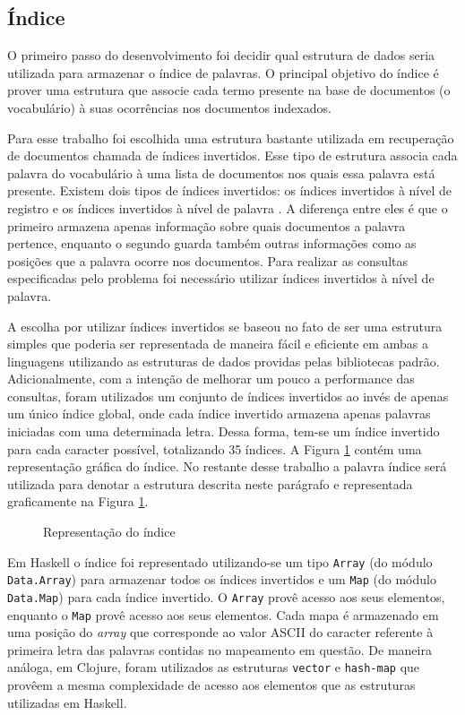 \subsection{Índice}

O primeiro passo do desenvolvimento foi decidir qual estrutura de dados seria utilizada para armazenar o índice de palavras. O principal objetivo do índice é prover uma estrutura que associe cada termo presente na base de documentos (o vocabulário) à suas ocorrências nos documentos indexados.

Para esse trabalho foi escolhida uma estrutura bastante utilizada em recuperação de documentos chamada de índices invertidos. Esse tipo de estrutura associa cada palavra  do vocabulário à uma lista de documentos nos quais essa palavra está presente. Existem dois tipos de índices invertidos: os índices invertidos à nível de registro e os índices invertidos à nível de palavra \cite{baeza1999modern}. A diferença entre eles é que o primeiro armazena apenas informação sobre quais documentos a palavra pertence, enquanto o segundo guarda também outras informações como as posições que a palavra ocorre nos documentos. Para realizar as consultas especificadas pelo problema foi necessário utilizar índices invertidos à nível de palavra.

A escolha por utilizar índices invertidos se baseou no fato de ser uma estrutura simples que poderia ser representada de maneira fácil e eficiente em ambas a linguagens utilizando as estruturas de dados providas pelas bibliotecas padrão. Adicionalmente, com a intenção de melhorar um pouco a performance das consultas, foram utilizados um conjunto de índices invertidos ao invés de apenas um único índice global, onde cada índice invertido armazena apenas palavras iniciadas com uma determinada letra. Dessa forma, tem-se um índice invertido para cada caracter possível, totalizando 35 índices. A Figura \ref{fig:indice} contém uma representação gráfica do índice. No restante desse trabalho a palavra índice será utilizada para denotar a estrutura descrita neste parágrafo e representada graficamente na Figura \ref{fig:indice}.

\begin{figure}[h]
 \centering
 \def\svgwidth{0.6\columnwidth}
 
 \caption{Representação do índice}
 \label{fig:indice}
\end{figure}


Em Haskell o índice foi representado utilizando-se um tipo \verb|Array| (do módulo \verb|Data.Array|) para armazenar todos os índices invertidos e um \verb|Map| (do módulo \verb|Data.Map|) para cada índice invertido. O \verb|Array| provê acesso  aos seus elementos, enquanto o \verb|Map| provê acesso  aos seus elementos. Cada mapa é armazenado em uma posição do \emph{array} que corresponde ao valor ASCII do caracter referente à primeira letra das palavras contidas no mapeamento em questão. De maneira análoga, em Clojure, foram utilizados as estruturas \verb|vector| e \verb|hash-map| que provêem a mesma complexidade de acesso aos elementos que as estruturas utilizadas em Haskell.

